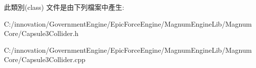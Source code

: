 此類別(class) 文件是由下列檔案中產生\+:\begin{DoxyCompactItemize}
\item 
C\+:/innovation/\+Government\+Engine/\+Epic\+Force\+Engine/\+Magnum\+Engine\+Lib/\+Magnum\+Core/Capsule3\+Collider.\+h\item 
C\+:/innovation/\+Government\+Engine/\+Epic\+Force\+Engine/\+Magnum\+Engine\+Lib/\+Magnum\+Core/Capsule3\+Collider.\+cpp\end{DoxyCompactItemize}
